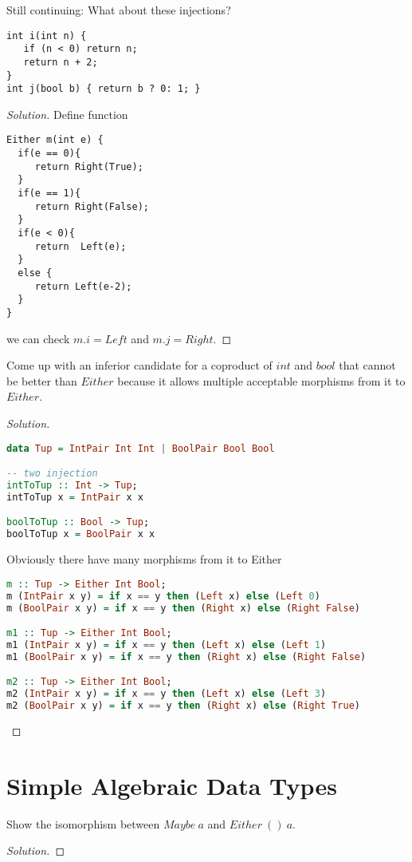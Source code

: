 \documentclass[7x10,thmnumcontwithchapter,WebLink,AddlevelTwoTOC,NumRef,BookEndNote,printer]{pupbook}
\begin{document}
\begin{exercise}
Still continuing: What about these injections?
\begin{lstlisting}
int i(int n) {
   if (n < 0) return n;
   return n + 2;
}
int j(bool b) { return b ? 0: 1; }
\end{lstlisting}
\end{exercise}


\begin{proof}[Solution]	
Define function
\begin{lstlisting}
Either m(int e) {
  if(e == 0){
     return Right(True);
  }
  if(e == 1){
     return Right(False);
  }
  if(e < 0){
     return  Left(e);
  }
  else {
     return Left(e-2);
  }
}
\end{lstlisting}
we can check $m . i = Left$ and $m . j = Right$.
\end{proof}


\begin{exercise}
Come up with an inferior candidate for a coproduct of $int$ and $bool$ that cannot be better than $Either$ because it allows multiple acceptable morphisms from it to $Either$.
\end{exercise}

\begin{proof}[Solution]
~\\
\begin{lstlisting}[language=Haskell]
data Tup = IntPair Int Int | BoolPair Bool Bool 

-- two injection
intToTup :: Int -> Tup;
intToTup x = IntPair x x

boolToTup :: Bool -> Tup;
boolToTup x = BoolPair x x 
\end{lstlisting}
Obviously there have many morphisms from it to Either 
\begin{lstlisting}[language=Haskell]
m :: Tup -> Either Int Bool;
m (IntPair x y) = if x == y then (Left x) else (Left 0) 
m (BoolPair x y) = if x == y then (Right x) else (Right False) 

m1 :: Tup -> Either Int Bool;
m1 (IntPair x y) = if x == y then (Left x) else (Left 1) 
m1 (BoolPair x y) = if x == y then (Right x) else (Right False)

m2 :: Tup -> Either Int Bool;
m2 (IntPair x y) = if x == y then (Left x) else (Left 3) 
m2 (BoolPair x y) = if x == y then (Right x) else (Right True)  
\end{lstlisting}
\end{proof}


\chapter[Simple Algebraic Data Types]{Simple Algebraic Data Types\thefootnote}

\begin{exercise}
Show the isomorphism between $Maybe \ a$ and $Either \ () \ a$.
\end{exercise}

\begin{proof}[Solution]	


\end{proof}
\end{document}
